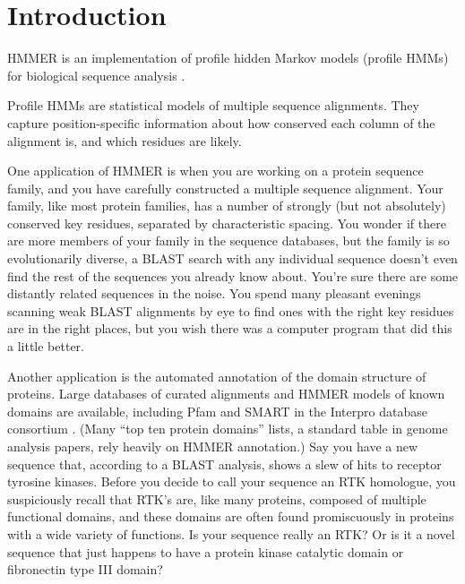 \section{Introduction}

HMMER is an implementation of profile hidden Markov models (profile
HMMs) for biological sequence analysis
\cite{Krogh94,Eddy98,Durbin98}. 

Profile HMMs are statistical models of multiple sequence alignments.
They capture position-specific information about how conserved each
column of the alignment is, and which residues are likely.

One application of HMMER is when you are working on a protein sequence
family, and you have carefully constructed a multiple sequence
alignment. Your family, like most protein families, has a number of
strongly (but not absolutely) conserved key residues, separated by
characteristic spacing. You wonder if there are more members of your
family in the sequence databases, but the family is so evolutionarily
diverse, a BLAST search with any individual sequence doesn't even find
the rest of the sequences you already know about. You're sure there
are some distantly related sequences in the noise. You spend many
pleasant evenings scanning weak BLAST alignments by eye to find ones
with the right key residues are in the right places, but you wish
there was a computer program that did this a little better.

Another application is the automated annotation of the domain
structure of proteins. Large databases of curated alignments and HMMER
models of known domains are available, including Pfam \cite{Bateman02}
and SMART \cite{LetunicBork02} in the Interpro database consortium
\cite{Mulder03}. (Many ``top ten protein domains'' lists, a standard
table in genome analysis papers, rely heavily on HMMER annotation.)
Say you have a new sequence that, according to a BLAST analysis, shows
a slew of hits to receptor tyrosine kinases. Before you decide to call
your sequence an RTK homologue, you suspiciously recall that RTK's
are, like many proteins, composed of multiple functional domains, and
these domains are often found promiscuously in proteins with a wide
variety of functions. Is your sequence really an RTK? Or is it a novel
sequence that just happens to have a protein kinase catalytic domain
or fibronectin type III domain?

